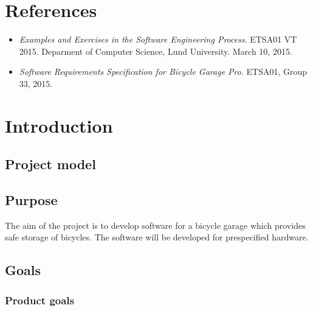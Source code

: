 \documentclass[12pt,titlepage]{article}
\begin{document}


\maketitle
\newpage
\tableofcontents
\thispagestyle{empty}
\setcounter{page}{0}
\newpage


\section{References}
\label{sec:references}

\begin{itemize}
	\item \textit{Examples and Exercises in the Software
		Engineering Process}. ETSA01 VT 2015. Deparment of Computer
		Science, Lund University. March 10, 2015.
	\item \textit{Software Requirements Specification for Bicycle Garage
		Pro}. ETSA01, Group 33, 2015.
\end{itemize}


\section{Introduction}

\subsection{Project model}

\subsection{Purpose}

The aim of the project is to develop software for a bicycle garage which
provides safe storage of bicycles. The software will be developed for
prespecified hardware.

\subsection{Goals}

\subsubsection{Product goals}
\end{document}
